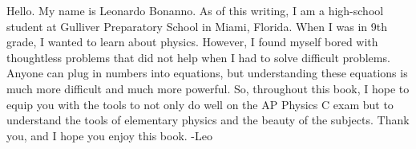 Hello. My name is Leonardo Bonanno. As of this writing, I am a high-school student at Gulliver Preparatory School in Miami, Florida. When I was in 9th grade, I wanted to learn about physics. However, I found myself bored with thoughtless problems that did not help when I had to solve difficult problems. Anyone can plug in numbers into equations, but understanding these equations is much more difficult and much more powerful. So, throughout this book, I hope to equip you with the tools to not only do well on the AP Physics C exam but to understand the tools of elementary physics and the beauty of the subjects. Thank you, and I hope you enjoy this book.
\newline
-Leo

\pagebreak